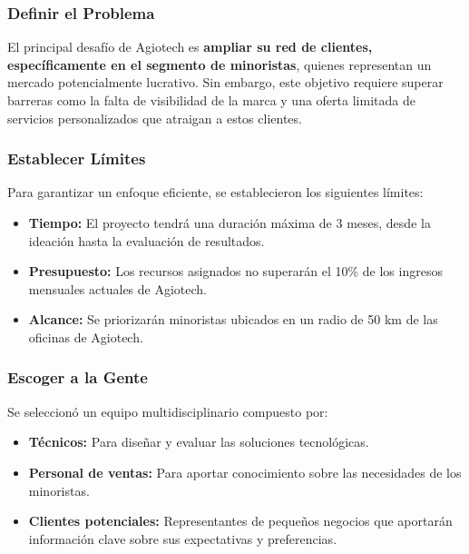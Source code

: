 \subsubsection{Definir el Problema}

El principal desafío de Agiotech es \textbf{ampliar su red de clientes, específicamente
	en el segmento de minoristas}, quienes representan un mercado potencialmente
lucrativo. Sin embargo, este objetivo requiere superar barreras como la falta de
visibilidad de la marca y una oferta limitada de servicios personalizados que
atraigan a estos clientes.

\subsubsection{Establecer Límites}

Para garantizar un enfoque eficiente, se establecieron los siguientes límites:

\begin{itemize}
	\item \textbf{Tiempo:} El proyecto tendrá una duración máxima de 3 meses, desde
	      la ideación hasta la evaluación de resultados.

	\item \textbf{Presupuesto:} Los recursos asignados no superarán el 10\% de los
	      ingresos mensuales actuales de Agiotech.

	\item \textbf{Alcance:} Se priorizarán minoristas ubicados en un radio de 50
	      km de las oficinas de Agiotech.
\end{itemize}

\subsubsection{Escoger a la Gente}

Se seleccionó un equipo multidisciplinario compuesto por:

\begin{itemize}
	\item \textbf{Técnicos:} Para diseñar y evaluar las soluciones tecnológicas.

	\item \textbf{Personal de ventas:} Para aportar conocimiento sobre las
	      necesidades de los minoristas.

	\item \textbf{Clientes potenciales:} Representantes de pequeños negocios que
	      aportarán información clave sobre sus expectativas y preferencias.
\end{itemize}

